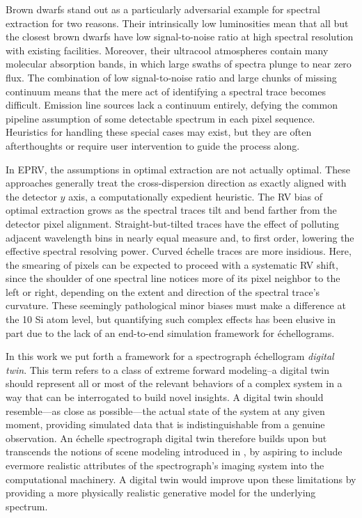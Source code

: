 \documentclass[twocolumn]{aastex63}
\begin{document}
Brown dwarfs stand out as a particularly adversarial example for spectral extraction for two reasons.  Their intrinsically low luminosities mean that all but the closest brown dwarfs have low signal-to-noise ratio at high spectral resolution with existing facilities.  Moreover, their ultracool atmospheres contain many molecular absorption bands, in which large swaths of spectra plunge to near zero flux.  The combination of low signal-to-noise ratio and large chunks of missing continuum means that the mere act of identifying a spectral trace becomes difficult. Emission line sources lack a continuum entirely, defying the common pipeline assumption of some detectable spectrum in each pixel sequence.  Heuristics for handling these special cases may exist, but they are often afterthoughts or require user intervention to guide the process along.

In EPRV, the assumptions in optimal extraction are not actually optimal.  These approaches generally treat the cross-dispersion direction as exactly aligned with the detector $y$ axis, a computationally expedient heuristic. The RV bias of optimal extraction grows as the spectral traces tilt and bend farther from the detector pixel alignment.  Straight-but-tilted traces have the effect of polluting adjacent wavelength bins in nearly equal measure and, to first order, lowering the effective spectral resolving power.  Curved \'echelle traces are more insidious.  Here, the smearing of pixels can be expected to proceed with a systematic RV shift, since the shoulder of one spectral line notices more of its pixel neighbor to the left or right, depending on the extent and direction of the spectral trace's curvature.  These seemingly pathological minor biases must make a difference at the 10 Si atom level, but quantifying such complex effects has been elusive in part due to the lack of an end-to-end simulation framework for \'echellograms.

In this work we put forth a framework for a spectrograph \'echellogram \emph{digital twin}.  This term refers to a class of extreme forward modeling--a digital twin should represent all or most of the relevant behaviors of a complex system in a way that can be interrogated to build novel insights.  A digital twin should resemble---as close as possible---the actual state of the system at any given moment, providing simulated data that is indistinguishable from a genuine observation.  An \'echelle spectrograph digital twin therefore builds upon but transcends the notions of scene modeling introduced in \citet{2010PASP..122..248B}, by aspiring to include evermore realistic attributes of the spectrograph's imaging system into the computational machinery.  A digital twin would improve upon these limitations by providing a more physically realistic generative model for the underlying spectrum.
\end{document}
